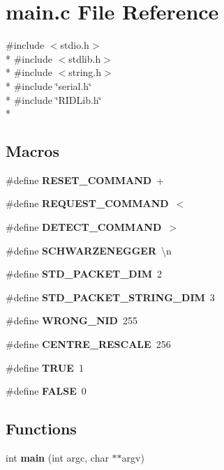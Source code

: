 \section{main.\+c File Reference}
\label{main_8c}
{\ttfamily \#include $<$stdio.\+h$>$}\\*
{\ttfamily \#include $<$stdlib.\+h$>$}\\*
{\ttfamily \#include $<$string.\+h$>$}\\*
{\ttfamily \#include \char`\"{}serial.\+h\char`\"{}}\\*
{\ttfamily \#include \char`\"{}R\+I\+D\+Lib.\+h\char`\"{}}\\*
\subsection*{Macros}
\begin{DoxyCompactItemize}
\item 
\#define {\bf R\+E\+S\+E\+T\+\_\+\+C\+O\+M\+M\+A\+ND}~\textquotesingle{}+\textquotesingle{}
\item 
\#define {\bf R\+E\+Q\+U\+E\+S\+T\+\_\+\+C\+O\+M\+M\+A\+ND}~\textquotesingle{}$<$\textquotesingle{}
\item 
\#define {\bf D\+E\+T\+E\+C\+T\+\_\+\+C\+O\+M\+M\+A\+ND}~\textquotesingle{}$>$\textquotesingle{}
\item 
\#define {\bf S\+C\+H\+W\+A\+R\+Z\+E\+N\+E\+G\+G\+ER}~\textquotesingle{}\textbackslash{}n\textquotesingle{}
\item 
\#define {\bf S\+T\+D\+\_\+\+P\+A\+C\+K\+E\+T\+\_\+\+D\+IM}~2
\item 
\#define {\bf S\+T\+D\+\_\+\+P\+A\+C\+K\+E\+T\+\_\+\+S\+T\+R\+I\+N\+G\+\_\+\+D\+IM}~3
\item 
\#define {\bf W\+R\+O\+N\+G\+\_\+\+N\+ID}~255
\item 
\#define {\bf C\+E\+N\+T\+R\+E\+\_\+\+R\+E\+S\+C\+A\+LE}~256
\item 
\#define {\bf T\+R\+UE}~1
\item 
\#define {\bf F\+A\+L\+SE}~0
\end{DoxyCompactItemize}
\subsection*{Functions}
\begin{DoxyCompactItemize}
\item 
int {\bf main} (int argc, char $\ast$$\ast$argv)
\end{DoxyCompactItemize}


